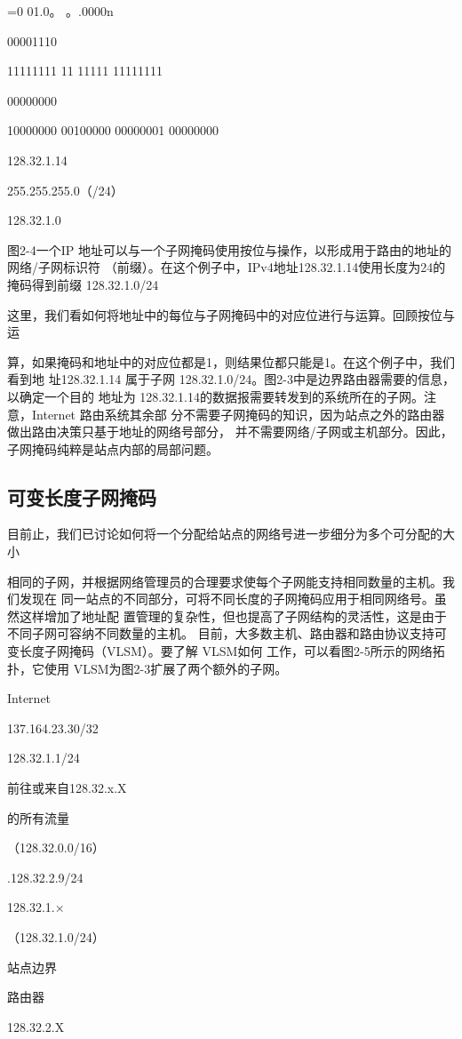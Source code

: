 =0 01.0。 。.0000n

00001110

11111111 11 11111 11111111

00000000

10000000 00100000 00000001 00000000

128.32.1.14

255.255.255.0（/24）

128.32.1.0

图2-4一个IP 地址可以与一个子网掩码使用按位与操作，以形成用于路由的地址的网络/子网标识符
（前缀）。在这个例子中，IPv4地址128.32.1.14使用长度为24的掩码得到前缀 128.32.1.0/24

这里，我们看如何将地址中的每位与子网掩码中的对应位进行与运算。回顾按位与运

算，如果掩码和地址中的对应位都是1，则结果位都只能是1。在这个例子中，我们看到地
址128.32.1.14 属于子网 128.32.1.0/24。图2-3中是边界路由器需要的信息，以确定一个目的
地址为 128.32.1.14的数据报需要转发到的系统所在的子网。注意，Internet 路由系统其余部
分不需要子网掩码的知识，因为站点之外的路由器做出路由决策只基于地址的网络号部分，
并不需要网络/子网或主机部分。因此，子网掩码纯粹是站点内部的局部问题。

\subsection{可变长度子网掩码}
目前止，我们已讨论如何将一个分配给站点的网络号进一步细分为多个可分配的大小

相同的子网，并根据网络管理员的合理要求使每个子网能支持相同数量的主机。我们发现在
同一站点的不同部分，可将不同长度的子网掩码应用于相同网络号。虽然这样增加了地址配
置管理的复杂性，但也提高了子网结构的灵活性，这是由于不同子网可容纳不同数量的主机。
目前，大多数主机、路由器和路由协议支持可变长度子网掩码（VLSM）。要了解 VLSM如何
工作，可以看图2-5所示的网络拓扑，它使用 VLSM为图2-3扩展了两个额外的子网。

Internet

137.164.23.30/32

128.32.1.1/24

前往或来自128.32.x.X

的所有流量

（128.32.0.0/16）

.128.32.2.9/24

128.32.1.×

（128.32.1.0/24）

站点边界

路由器

128.32.2.X

